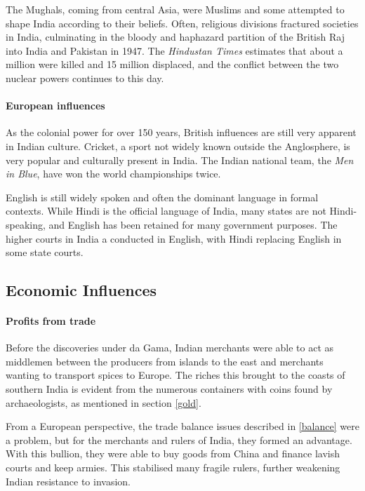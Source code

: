 \documentclass[11pt, a4paper, headings=standardclasses]{scrartcl}
\begin{document}
The Mughals, coming from central Asia, were Muslims and some attempted to shape India according to their beliefs. Often, religious divisions fractured societies in India, culminating in the bloody and haphazard partition of the British Raj into India and Pakistan in 1947. The \textit{Hindustan Times} estimates that about a million were killed and 15 million displaced, and the conflict between the two nuclear powers continues to this day.\autocite[Chapter VI]{guha, partition}

\paragraph{European influences}

As the colonial power for over 150 years, British influences are still very apparent in Indian culture. Cricket, a sport not widely known outside the Anglosphere, is very popular and culturally present in India.\autocite{cricket} The Indian national team, the \textit{Men in Blue}, have won the world championships twice.\autocite{bbc}

English is still widely spoken and often the dominant language in formal contexts. While Hindi is the official language of India, many states are not Hindi-speaking, and English has been retained for many government purposes. The higher courts in India a conducted in English, with Hindi replacing English in some state courts.\autocite{english}

\subsection{Economic Influences}

\paragraph{Profits from trade}

Before the discoveries under da Gama, Indian merchants were able to act as middlemen between the producers from islands to the east and merchants wanting to transport spices to Europe.\autocite{srilanka} The riches this brought to the coasts of southern India is evident from the numerous containers with coins found by archaeologists, as mentioned in section \ref{gold}.

From a European perspective, the trade balance issues described in \ref{balance} were a problem, but for the merchants and rulers of India, they formed an advantage. With this bullion, they were able to buy goods from China and finance lavish courts and keep armies.\autocite[397]{FT} This stabilised many fragile rulers, further weakening Indian resistance to invasion.
\end{document}
